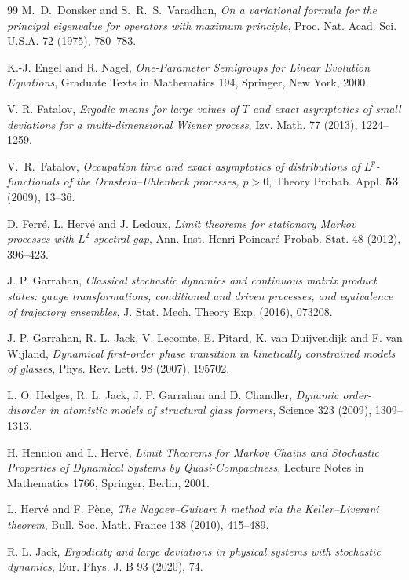 \documentclass[11pt,reqno]{amsart}
\theoremstyle{definition}
\numberwithin{equation}{section}
\newcommand{\<}{\langle}
\renewcommand{\>}{\rangle}
\begin{document}
\begin{thebibliography}{99}
M.~D.~Donsker and S.~R.~S.~Varadhan,
\emph{On a variational formula for the principal eigenvalue for operators
with maximum principle},
Proc. Nat. Acad. Sci. U.S.A. 72 (1975), 780--783.


K.-J. Engel and R. Nagel,
\emph{One-Parameter Semigroups for Linear Evolution Equations},
Graduate Texts in Mathematics 194, Springer, New York, 2000.


V. R. Fatalov,
\emph{Ergodic means for large values of $T$ and exact asymptotics of small
deviations for a multi-dimensional Wiener process},
Izv. Math. 77 (2013), 1224--1259.

V.~R.~Fatalov,
\emph{Occupation time and exact asymptotics of distributions of
 $L^p $-functionals of the Ornstein--Uhlenbeck processes,  $p>0 $},
Theory Probab. Appl. \textbf{53} (2009), 13--36.

D. Ferr\'e, L. Herv\'e and J. Ledoux,
\emph{Limit theorems for stationary Markov processes with $L^2$-spectral
gap},
Ann. Inst. Henri Poincar\'e Probab. Stat. 48 (2012), 396--423.

J. P. Garrahan,
\emph{Classical stochastic dynamics and continuous matrix product states:
gauge transformations, conditioned and driven processes, and equivalence
of trajectory ensembles},
J. Stat. Mech. Theory Exp. (2016), 073208.

J. P. Garrahan, R. L. Jack, V. Lecomte, E. Pitard,
K. van Duijvendijk and F. van Wijland,
\emph{Dynamical first-order phase transition in kinetically constrained
models of glasses},
Phys. Rev. Lett. 98 (2007), 195702.

L. O. Hedges, R. L. Jack, J. P. Garrahan and D. Chandler,
\emph{Dynamic order-disorder in atomistic models of structural glass
formers},
Science 323 (2009), 1309--1313.

H. Hennion and L. Herv\'e,
\emph{Limit Theorems for Markov Chains and Stochastic Properties of Dynamical
Systems by Quasi-Compactness},
Lecture Notes in Mathematics 1766, Springer, Berlin, 2001.

L. Herv\'e and F. P\`ene,
\emph{The Nagaev--Guivarc'h method via the Keller--Liverani theorem},
Bull. Soc. Math. France 138 (2010), 415--489.

R. L. Jack,
\emph{Ergodicity and large deviations in physical systems with stochastic
dynamics},
Eur. Phys. J. B 93 (2020), 74.


\end{thebibliography}
\end{document}

